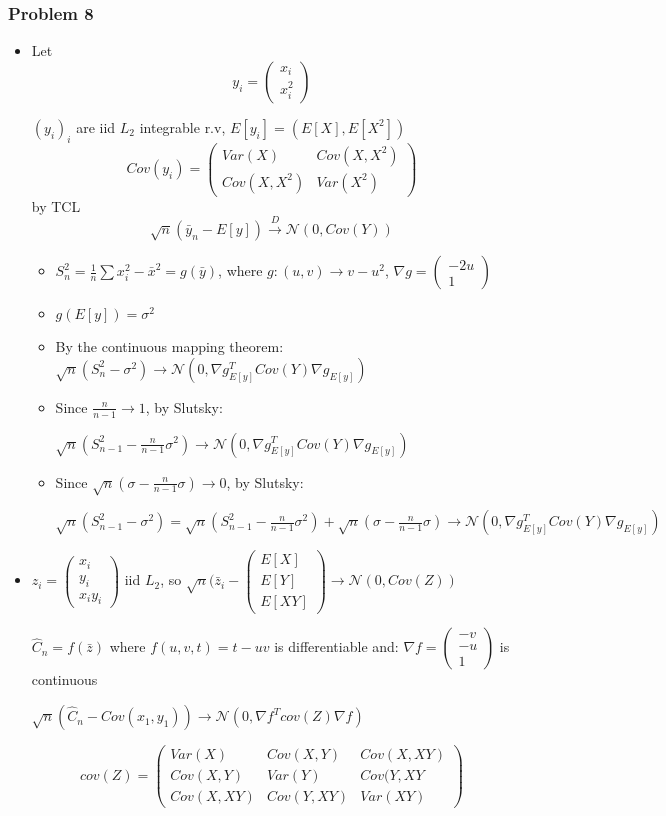 \documentclass[12pt]{article}
\newcommand{\Q}[1]{\subsubsection*{Problem #1}}
\newcommand{\icol}[1]{%
  \left(\begin{smallmatrix}#1\end{smallmatrix}\right)%
}
\begin{document}
\Q{8}
\begin{itemize}
\item Let \[y_i = \left( \begin{array}{c} x_i\\x_i^2\end{array} \right)\]


  $(y_i)_i$ are iid $L_2$ integrable r.v,
  $E[y_i] = (E[X], E[X^2])$
  \[ Cov(y_i) = \left( \begin{array}{cc} Var(X) & Cov(X, X^2)\\Cov(X,X^2) & Var(X^2)  \end{array}\right) \]
  by TCL $$\sqrt n (\bar y_n - E[y]) \overset{D}{\rightarrow} \mathcal N(0, Cov(Y))$$
  \begin{itemize}
  \item 
    $S_{n}^2 = \frac1n \sum x_i^2 - {\bar x}^2 = g(\bar y)$, where $g: (u, v) \rightarrow v - u^2$, $\nabla g = \icol{-2u\\1}$
  \item 
  $g(E[y]) = \sigma^2$
\end{itemize}  
\begin{itemize}
\item By the continuous mapping theorem:
  $ \sqrt n (S_n^2 - \sigma^2) \rightarrow \mathcal N (0, \nabla
  g_{E[y]}^T Cov(Y) \nabla g_{E[y]})$

\item Since $\frac n{n-1} \rightarrow 1$, by Slutsky:

  $ \sqrt n (S_{n-1}^2 - \frac n{n-1}\sigma^2) \rightarrow \mathcal N
  (0, \nabla g_{E[y]}^T Cov(Y) \nabla g_{E[y]})$

\item Since $\sqrt n (\sigma - \frac n{n-1}\sigma ) \rightarrow 0$, by Slutsky:

  $ \sqrt n (S_{n-1}^2 - \sigma^2) = \sqrt n (S_{n-1}^2 - \frac
  n{n-1}\sigma^2) + \sqrt n (\sigma - \frac n{n-1}\sigma ) \rightarrow
  \mathcal N (0, \nabla g_{E[y]}^T Cov(Y) \nabla g_{E[y]})$
\end{itemize}

\item
  $z_i = \icol { x_i\\ y_i\\ x_iy_i}$ iid $L_2$, so $\sqrt{n}(\bar z_i - \icol { E[X]\\ E[Y] \\ E[XY]} \rightarrow \mathcal N(0, Cov(Z))$
  
  $\hat C_n = f(\bar z)$ where $f(u, v, t) = t - uv$ is differentiable and:
  $\nabla f = \icol{ -v\\ -u \\1 }$ is continuous

  $\sqrt{n}(\hat C_n - Cov(x_1,y_1)) \rightarrow \mathcal N(0, \nabla f^T cov(Z) \nabla f)$

  \[ cov(Z) = \left(
      \begin{array}{ccc}
        Var(X) & Cov(X, Y)& Cov(X, XY)\\
        Cov(X,Y) & Var(Y) & Cov(Y, XY\\
        Cov(X, XY) &  Cov(Y, XY)& Var(XY) \end{array}
    \right)
  \]
\end{itemize}
\end{document}

